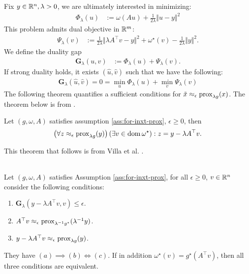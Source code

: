 \documentclass[12pt]{article}
\begin{document}
        Fix $y \in \mathbb R^n, \lambda > 0$, we are ultimately interested in minimizing: 
        \begin{align}\label{eqn:primal-pp}
            \Phi_\lambda(u) &:= \omega(Au) + \frac{1}{2\lambda} \Vert u - y\Vert^2
        \end{align}
        This problem admits dual objective in $\mathbb R^m$: 
        \begin{align}\label{eqn:dual-pp}
            \Psi_\lambda(v) &:=
            \frac{1}{2\lambda}\Vert \lambda A^\top v - y\Vert^2
            + \omega^\star(v) - \frac{1}{2\lambda}\Vert y\Vert^2. 
        \end{align}
        We define the duality gap
        \begin{align}
            \mathbf G_\lambda(u, v) &:= \Phi_\lambda(u) + \Psi_\lambda(v). 
        \end{align}
        If strong duality holds, it exists $(\hat u, \hat v)$ such that we have the following: 
        \begin{align*}
            \mathbf G_\lambda(\hat u, \hat v) = 0 = \min_{u} \Phi_\lambda(u) + \min_v \Psi_\lambda(v)
        \end{align*}
        The following theorem quantifies a sufficient conditions for $\tilde x \approx_\epsilon \operatorname{prox}_{\lambda g}(x)$. 
        The theorem below is from \cite[Proposition 2.2]{villa_accelerated_2013}. 
        \begin{theorem}\label{thm:primal-dual-trans}
            Let $(g, \omega, A)$ satisfies assumption \ref{ass:for-inxt-prox}, $\epsilon \ge 0$, then 
            \begin{align*}
                \left(
                    \forall z \approx_\epsilon \operatorname{prox}_{\lambda g}(y) 
                \right)(\exists v \in \operatorname{dom} \omega^\star): z = y - \lambda A^\top v. 
            \end{align*}
        \end{theorem}
        This theorem that follows is from Villa et al. \cite[Proposition 2.3]{villa_accelerated_2013}. 
        \begin{theorem}\;\label{thm:dlty-gap-inxt-pp}\\
            Let $(g, \omega, A)$ satisfies Assumption \ref{ass:for-inxt-prox}, for all $\epsilon \ge 0$, $v \in \mathbb R^n$ consider the following conditions: 
            \begin{enumerate}[nosep]
                \item $\mathbf G_\lambda(y - \lambda A^\top v, v) \le \epsilon$. 
                \item $A^\top v \approx_\epsilon \operatorname{prox}_{\lambda^{-1}g^\star}(\lambda^{-1}y)$. 
                \item $y - \lambda A^\top v \approx_{\epsilon} \operatorname{prox}_{\lambda g}(y)$. 
            \end{enumerate}
            They have $(a)\implies (b) \iff (c)$. 
            If in addition $\omega^\star(v) = g^\star(A^\top v)$, then all three conditions are equivalent. 
        \end{theorem}
\end{document}
